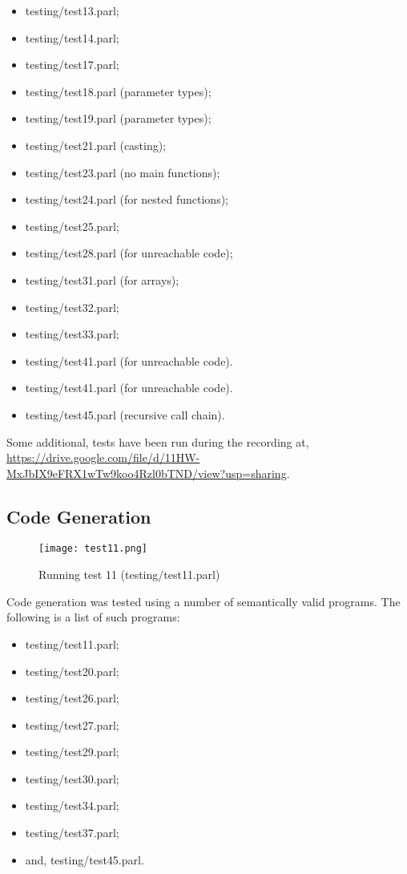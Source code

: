 \begin{itemize}
    \item testing/test13.parl;
    \item testing/test14.parl;
    \item testing/test17.parl;
    \item testing/test18.parl (parameter types);
    \item testing/test19.parl (parameter types);
    \item testing/test21.parl (casting);
    \item testing/test23.parl (no main functions);
    \item testing/test24.parl (for nested functions);
    \item testing/test25.parl;
    \item testing/test28.parl (for unreachable code);
    \item testing/test31.parl (for arrays);
    \item testing/test32.parl;
    \item testing/test33.parl;
    \item testing/test41.parl (for unreachable code).
    \item testing/test41.parl (for unreachable code).
    \item testing/test45.parl (recursive call chain).
\end{itemize}

Some additional, tests have been run during the recording at,
\url{https://drive.google.com/file/d/11HW-MxJbIX9eFRX1wTw9koo4Rzl0bTND/view?usp=sharing}.

\subsection{Code Generation}

\begin{figure}[H]
\centering
\texttt{[image: test11.png]}
\caption{Running test 11 (testing/test11.parl)}
\end{figure}

Code generation was tested using a number of semantically valid
programs. The following is a list of such programs:

\begin{itemize}
    \item testing/test11.parl;
    \item testing/test20.parl;
    \item testing/test26.parl;
    \item testing/test27.parl;
    \item testing/test29.parl;
    \item testing/test30.parl;
    \item testing/test34.parl;
    \item testing/test37.parl;
    \item and, testing/test45.parl.
\end{itemize}

